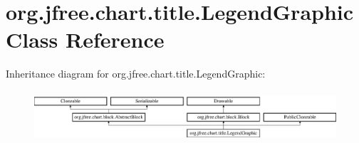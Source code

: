 \hypertarget{classorg_1_1jfree_1_1chart_1_1title_1_1_legend_graphic}{}\section{org.\+jfree.\+chart.\+title.\+Legend\+Graphic Class Reference}
\label{classorg_1_1jfree_1_1chart_1_1title_1_1_legend_graphic}
Inheritance diagram for org.\+jfree.\+chart.\+title.\+Legend\+Graphic\+:\begin{figure}[H]
\begin{center}
\leavevmode
\includegraphics[height=1.926605cm]{classorg_1_1jfree_1_1chart_1_1title_1_1_legend_graphic}
\end{center}
\end{figure}
